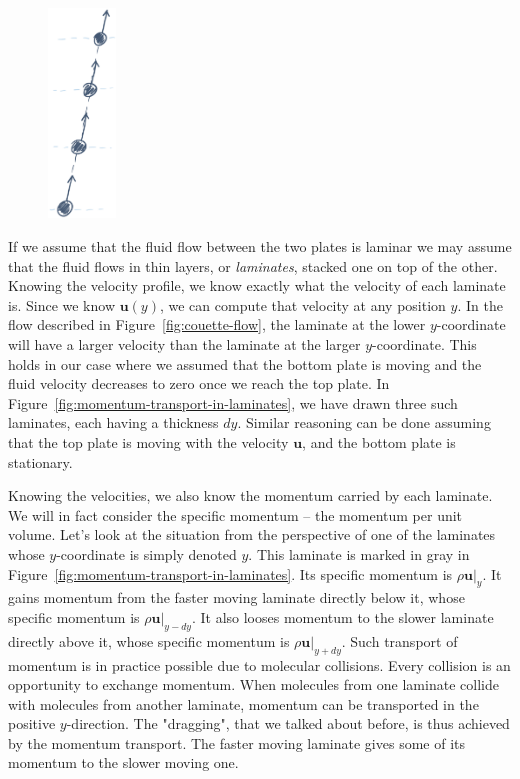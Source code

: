 \documentclass[10pt,twocolumn]{article}
\begin{document}
\begin{figure}
\centering\includegraphics[width=1.8cm]{molecular-collisions.png}
\label{fig:molecular-collisions}
\end{figure}
If we assume that the fluid flow between the two plates is laminar we may assume that the fluid flows in thin layers, or \textit{laminates}, stacked one on top of the other. Knowing the velocity profile, we know exactly what the velocity of each laminate is. Since we know $\mathbf{u}(y)$, we can compute that velocity at any position $y$. In the flow described in Figure~\ref{fig:couette-flow}, the laminate at the lower $y$-coordinate will have a larger velocity than the laminate at the larger $y$-coordinate. This holds in our case where we assumed that the bottom plate is moving and the fluid velocity decreases to zero once we reach the top plate. In Figure~\ref{fig:momentum-transport-in-laminates}, we have drawn three such laminates, each having a thickness $dy$. Similar reasoning can be done assuming that the top plate is moving with the velocity $\mathbf{u}$, and the bottom plate is stationary.

Knowing the velocities, we also know the momentum carried by each laminate. We will in fact consider the specific momentum -- the momentum per unit volume. Let's look at the situation from the perspective of one of the laminates whose $y$-coordinate is simply denoted $y$. This laminate is marked in gray in Figure~\ref{fig:momentum-transport-in-laminates}. Its specific momentum is $\rho \mathbf{u}|_{y}$.  It gains momentum from the faster moving laminate directly below it, whose specific momentum is $\rho \mathbf{u}|_{y-dy}$. It also looses momentum to the slower laminate directly above it, whose specific momentum is $\rho \mathbf{u}|_{y+dy}$. Such transport of momentum is in practice possible due to molecular collisions. Every collision is an opportunity to exchange momentum. When molecules from one laminate collide with molecules from another laminate, momentum can be transported in the positive $y$-direction. The "dragging", that we talked about before, is thus achieved by the momentum transport. The faster moving laminate gives some of its momentum to the slower moving one.
\end{document}
